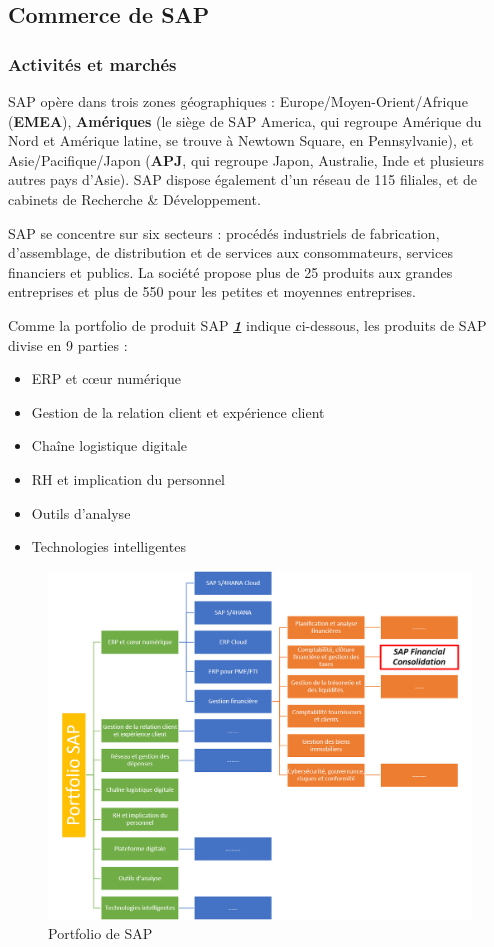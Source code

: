 \subsection{Commerce de SAP} 
\subsubsection{Activités et marchés}
\cite{SAP-entreprise_wikipedia}SAP opère dans trois zones géographiques : Europe/Moyen-Orient/Afrique (\textbf{EMEA}), \textbf{Amériques} (le siège de SAP America, qui regroupe Amérique du Nord et Amérique latine, se trouve à Newtown Square, en Pennsylvanie), et Asie/Pacifique/Japon (\textbf{APJ}, qui regroupe Japon, Australie, Inde et plusieurs autres pays d’Asie). SAP dispose également d’un réseau de 115 filiales, et de cabinets de Recherche \& Développement.

SAP se concentre sur six secteurs : procédés industriels de fabrication, d’assemblage, de distribution et de services aux consommateurs, services financiers et publics. La société propose plus de 25 produits aux grandes entreprises et plus de 550 pour les petites et moyennes entreprises.

\par Comme la portfolio de produit SAP \textbf{\textit{\ref{fig:portfolioSAP_label}}} indique ci-dessous, les produits de SAP divise en 9 parties : 
\begin{itemize}
	\item ERP et cœur numérique
	\item Gestion de la relation client et expérience client
	\item Chaîne logistique digitale
	\item RH et implication du personnel
	\item Outils d'analyse
	\item Technologies intelligentes
\end{itemize} 

\begin{figure}[H]
	\centering
	\includegraphics[width=\textwidth]{images/SAP_portfolio.png}
	\caption{Portfolio de SAP}
	\label{fig:portfolioSAP_label}
\end{figure}

